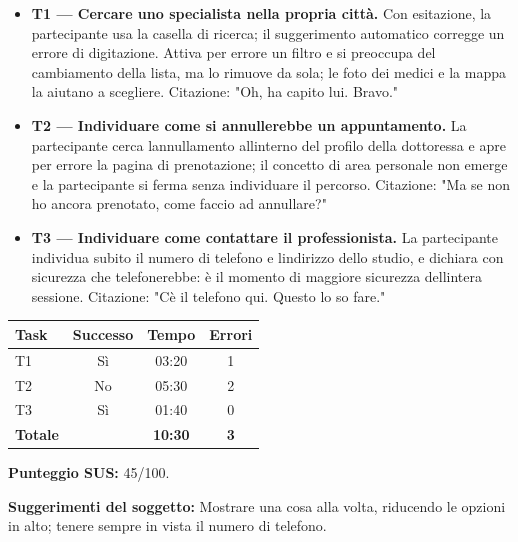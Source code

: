 \begin{itemize}
\item
  \textbf{T1 --- Cercare uno specialista nella propria città.}
  Con esitazione, la
  partecipante usa la casella di ricerca; il suggerimento automatico
  corregge un errore di digitazione. Attiva per errore un filtro e si
  preoccupa del cambiamento della lista, ma lo rimuove da sola; le
  foto dei medici e la mappa la aiutano a scegliere. Citazione: "Oh,
  ha capito lui. Bravo."
\item
  \textbf{T2 --- Individuare come si annullerebbe un appuntamento.}
  La partecipante cerca
  l\textquotesingle annullamento all\textquotesingle interno del
  profilo della dottoressa e apre per errore la pagina di
  prenotazione; il concetto di area personale non emerge e la
  partecipante si ferma senza individuare il percorso. Citazione: "Ma
  se non ho ancora prenotato, come faccio ad annullare?"
\item
  \textbf{T3 --- Individuare come contattare il professionista.}
  La partecipante individua
  subito il numero di telefono e l\textquotesingle indirizzo dello
  studio, e dichiara con sicurezza che telefonerebbe: è il momento di
  maggiore sicurezza dell\textquotesingle intera sessione. Citazione:
  "C\textquotesingle è il telefono qui. Questo lo so fare."
\end{itemize}

\begin{center}
\begin{minipage}{\linewidth}
\centering
{}\label{tab:a-9}
\noindent\begin{tabular}{lccc}
\toprule
\textbf{Task} & \textbf{Successo} & \textbf{Tempo} & \textbf{Errori} \\
\midrule
T1 & Sì & 03:20 & 1 \\
T2 & No & 05:30 & 2 \\
T3 & Sì & 01:40 & 0 \\
\midrule
\textbf{Totale} & & \textbf{10:30} & \textbf{3} \\
\bottomrule
\end{tabular}
\end{minipage}
\end{center}

\textbf{Punteggio SUS:} 45/100.

\textbf{Suggerimenti del soggetto:} Mostrare una cosa alla volta,
riducendo le opzioni in alto; tenere sempre in vista il numero di
telefono.

